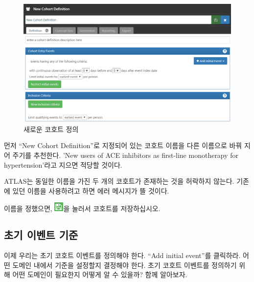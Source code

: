 \documentclass[11pt]{book}
\theoremstyle{definition}
\theoremstyle{definition}
\theoremstyle{definition}
\theoremstyle{remark}
\let\BeginKnitrBlock\begin \let\EndKnitrBlock\end
\begin{document}
\begin{figure}

{\centering \includegraphics[width=1\linewidth]{images/Cohorts/ATLAS-defineacohort} 

}

\caption{새로운 코호트 정의}\label{fig:ATLASdefineacohort}
\end{figure}

먼저 ``New Cohort Definition''로 지정되어 있는 코호트 이름을 다른
이름으로 바꿔 지어 주기를 추천한다. 'New users of ACE inhibitors as
first-line monotherapy for hypertension'라고 지으면 적당할 것이다.

\BeginKnitrBlock{rmdimportant}
ATLAS는 동일한 이름을 가진 두 개의 코호트가 존재하는 것을 허락하지
않는다. 기존에 있던 이름을 사용하려고 하면 에러 메시지가 뜰 것이다.
\EndKnitrBlock{rmdimportant}

이름을 정했으면, \includegraphics{images/Cohorts/save.png}을 눌러서
코호트를 저장하십시오.

\subsection{초기 이벤트 기준}\label{--}

이제 우리는 초기 코호트 이벤트를 정의해야 한다. ``Add initial event''를
클릭하라. 어떤 도메인 내에서 기준을 설정할지 결정해야 한다. 초기 코호트
이벤트를 정의하기 위해 어떤 도메인이 필요한지 어떻게 알 수 있을까? 함께
알아보자.
\end{document}
